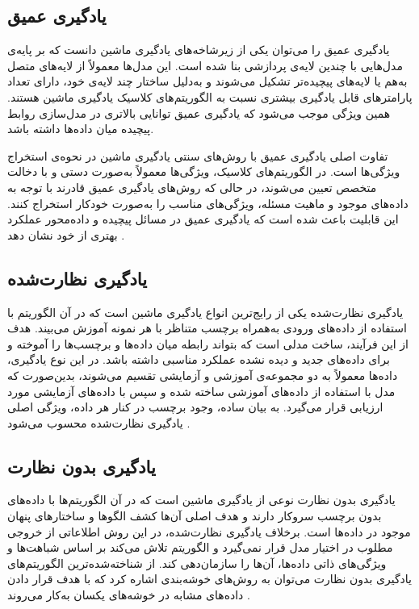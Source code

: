 \subsection{یادگیری عمیق}
یادگیری عمیق را می‌توان یکی از زیرشاخه‌های یادگیری ماشین دانست که بر پایه‌ی مدل‌هایی با چندین لایه‌ی پردازشی بنا شده است. این مدل‌ها معمولاً از لایه‌های متصل به‌هم یا لایه‌های پیچیده‌تر تشکیل می‌شوند و به‌دلیل ساختار چند لایه‌ی خود، دارای تعداد پارامترهای قابل یادگیری بیشتری نسبت به الگوریتم‌های کلاسیک یادگیری ماشین هستند. همین ویژگی موجب می‌شود که یادگیری عمیق توانایی بالاتری در مدل‌سازی روابط پیچیده میان داده‌ها داشته باشد.

تفاوت اصلی یادگیری عمیق با روش‌های سنتی یادگیری ماشین در نحوه‌ی استخراج ویژگی‌ها است. در الگوریتم‌های کلاسیک، ویژگی‌ها معمولاً به‌صورت دستی و با دخالت متخصص تعیین می‌شوند، در حالی که روش‌های یادگیری عمیق قادرند با توجه به داده‌های موجود و ماهیت مسئله، ویژگی‌های مناسب را به‌صورت خودکار استخراج کنند. این قابلیت باعث شده است که یادگیری عمیق در مسائل پیچیده و داده‌محور عملکرد بهتری از خود نشان دهد \cite{janiesch2021machine}.
\subsection{یادگیری نظارت‌شده}
یادگیری نظارت‌شده یکی از رایج‌ترین انواع یادگیری ماشین است که در آن الگوریتم با استفاده از داده‌های ورودی به‌همراه برچسب متناظر با هر نمونه آموزش می‌بیند. هدف از این فرآیند، ساخت مدلی است که بتواند رابطه‌ میان داده‌ها و برچسب‌ها را آموخته و برای داده‌های جدید و دیده ‌نشده عملکرد مناسبی داشته باشد. در این نوع یادگیری، داده‌ها معمولاً به دو مجموعه‌ی آموزشی و آزمایشی تقسیم می‌شوند، بدین‌صورت که مدل با استفاده از داده‌های آموزشی ساخته شده و سپس با داده‌های آزمایشی مورد ارزیابی قرار می‌گیرد. به بیان ساده، وجود برچسب در کنار هر داده، ویژگی اصلی یادگیری نظارت‌شده محسوب می‌شود \cite{dridi2021supervised}.
		
\subsection{یادگیری بدون نظارت}
یادگیری بدون نظارت نوعی از یادگیری ماشین است که در آن الگوریتم‌ها با داده‌های بدون برچسب سروکار دارند و هدف اصلی آن‌ها کشف الگوها و ساختارهای پنهان موجود در داده‌ها است. برخلاف یادگیری نظارت‌شده، در این روش اطلاعاتی از خروجی مطلوب در اختیار مدل قرار نمی‌گیرد و الگوریتم تلاش می‌کند بر اساس شباهت‌ها و ویژگی‌های ذاتی داده‌ها، آن‌ها را سازمان‌دهی کند. از شناخته‌شده‌ترین الگوریتم‌های یادگیری بدون نظارت می‌توان به روش‌های خوشه‌بندی اشاره کرد که با هدف قرار دادن داده‌های مشابه در خوشه‌های یکسان به‌کار می‌روند \cite{wu2021review}.

